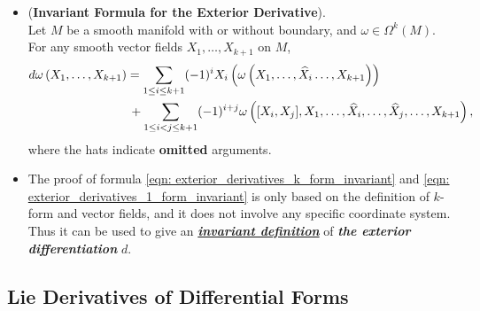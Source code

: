 \documentclass[11pt]{article}
\begin{document}
\begin{itemize}
\item \begin{proposition} (\textbf{Invariant Formula for the Exterior Derivative}).\\
Let $M$ be a smooth manifold with or without boundary, and $\omega \in \Omega^k(M)$. For any smooth vector fields $X_1,\ldots, X_{k+1}$ on $M$,
\begin{align}
d\omega\left(X_1,\ldots, X_{k+1}\right) &= \sum_{1\le i \le k+1}(-1)^{i}X_i\left(\omega\left(X_1,\ldots,  \widehat{X}_i  \ldots, X_{k+1}\right)\right)  \nonumber\\
&\, +   \sum_{1\le i < j \le k+1}(-1)^{i+j}\omega\left([X_i, X_j], X_1,\ldots,  \widehat{X}_i, \ldots,  \widehat{X}_j, \ldots, X_{k+1}\right),
 \label{eqn: exterior_derivatives_k_form_invariant}
\end{align}
where the hats indicate \textbf{omitted} arguments.
\end{proposition}

\item \begin{remark}
The proof of formula \eqref{eqn: exterior_derivatives_k_form_invariant} and \eqref{eqn: exterior_derivatives_1_form_invariant} is only based on the definition of $k$-form and vector fields, and it does not involve any specific coordinate system. Thus it can be used to give an \underline{\emph{\textbf{invariant definition}}} of \emph{\textbf{the exterior differentiation}} $d$.
\end{remark}
\end{itemize}

\subsection{Lie Derivatives of Differential Forms}

\newpage


\end{document}
